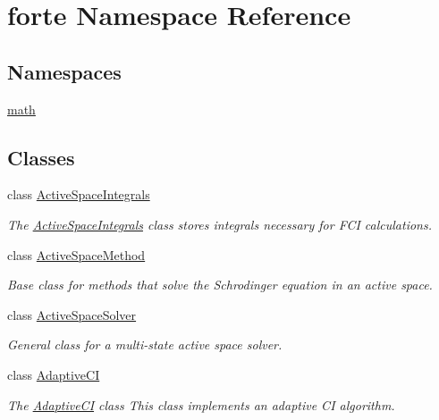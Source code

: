 \hypertarget{namespaceforte}{}\section{forte Namespace Reference}
\label{namespaceforte}
\subsection*{Namespaces}
\begin{DoxyCompactItemize}
\item 
 \mbox{\hyperlink{namespaceforte_1_1math}{math}}
\end{DoxyCompactItemize}
\subsection*{Classes}
\begin{DoxyCompactItemize}
\item 
class \mbox{\hyperlink{classforte_1_1_active_space_integrals}{Active\+Space\+Integrals}}
\begin{DoxyCompactList}\small\item\em The \mbox{\hyperlink{classforte_1_1_active_space_integrals}{Active\+Space\+Integrals}} class stores integrals necessary for F\+CI calculations. \end{DoxyCompactList}\item 
class \mbox{\hyperlink{classforte_1_1_active_space_method}{Active\+Space\+Method}}
\begin{DoxyCompactList}\small\item\em Base class for methods that solve the Schrodinger equation in an active space. \end{DoxyCompactList}\item 
class \mbox{\hyperlink{classforte_1_1_active_space_solver}{Active\+Space\+Solver}}
\begin{DoxyCompactList}\small\item\em General class for a multi-\/state active space solver. \end{DoxyCompactList}\item 
class \mbox{\hyperlink{classforte_1_1_adaptive_c_i}{Adaptive\+CI}}
\begin{DoxyCompactList}\small\item\em The \mbox{\hyperlink{classforte_1_1_adaptive_c_i}{Adaptive\+CI}} class This class implements an adaptive CI algorithm. \end{DoxyCompactList}\item 

\end{DoxyCompactItemize}
